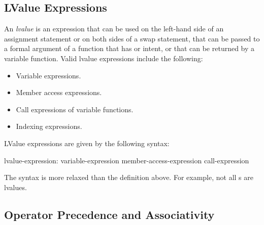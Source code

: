 \subsection{LValue Expressions}
\label{lvalue}

An {\em lvalue} is an expression that can be used on the left-hand
side of an assignment statement or on both sides of a swap statement,
that can be passed to a formal argument of a function that has  or 
 intent, or that can be returned by a variable function.  Valid 
lvalue expressions include the following:
\begin{itemize}
\item
 Variable expressions.
\item
 Member access expressions.
\item
 Call expressions of variable functions.
\item
 Indexing expressions.
\end{itemize}

LValue expressions are given by the following syntax:
\begin{syntax}
lvalue-expression:
  variable-expression
  member-access-expression
  call-expression
\end{syntax}
The syntax is more relaxed than the definition above.  For example, not
all s are lvalues.

\subsection{Operator Precedence and Associativity}
\label{Operator_Precedence_and_Associativity}

